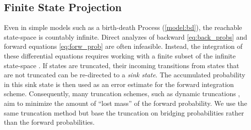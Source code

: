 \subsection{Finite State Projection}\label{sec:bridging:fsp}
Even in simple models such as a birth-death Process (\autoref{model:bd}), the
reachable state-space is countably infinite.
Direct analyzes of backward \eqref{eq:back_probs} and forward equations \eqref{eq:forw_prob} are often infeasible.
Instead, the integration of these differential equations requires working
with a finite subset of the infinite state-space \cite{munsky2006finite}.
If states are truncated, their incoming transitions from states that are not truncated can be re-directed to a \emph{sink state}.
The  accumulated probability in this sink state is then used
as an error estimate for the forward integration scheme.
Consequently, many truncation schemes, such as dynamic truncations \cite{andreychenko2011parameter}, aim to minimize the
amount of ``lost mass'' of the forward probability.
We use the same truncation method but base the truncation on bridging probabilities rather than the forward probabilities.


